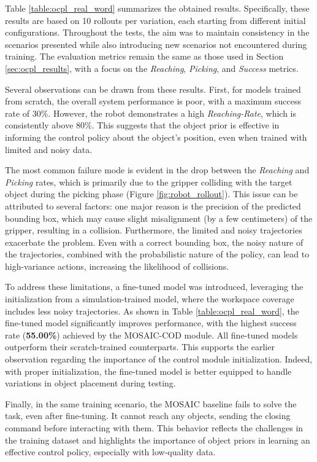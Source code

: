 Table \ref{table:ocpl_real_word} summarizes the obtained results. Specifically, these results are based on 10 rollouts per variation, each starting from different initial configurations. Throughout the tests, the aim was to maintain consistency in the scenarios presented while also introducing new scenarios not encountered during training. The evaluation metrics remain the same as those used in Section \ref{sec:ocpl_results}, with a focus on the \textit{Reaching}, \textit{Picking}, and \textit{Success} metrics.


Several observations can be drawn from these results. First, for models trained from scratch, the overall system performance is poor, with a maximum success rate of 30\%. However, the robot demonstrates a high \textit{Reaching-Rate}, which is consistently above 80\%. This suggests that the object prior is effective in informing the control policy about the object's position, even when trained with limited and noisy data. 

The most common failure mode is evident in the drop between the \textit{Reaching} and \textit{Picking} rates, which is primarily due to the gripper colliding with the target object during the picking phase (Figure \ref{fig:robot_rollout}). This issue can be attributed to several factors: one major reason is the precision of the predicted bounding box, which may cause slight misalignment (by a few centimeters) of the gripper, resulting in a collision. Furthermore, the limited and noisy trajectories exacerbate the problem. Even with a correct bounding box, the noisy nature of the trajectories, combined with the probabilistic nature of the policy, can lead to high-variance actions, increasing the likelihood of collisions.


To address these limitations, a fine-tuned model was introduced, leveraging the initialization from a simulation-trained model, where the workspace coverage includes less noisy trajectories. As shown in Table \ref{table:ocpl_real_word}, the fine-tuned model significantly improves performance, with the highest success rate (\textbf{55.00\%}) achieved by the MOSAIC-COD module. All fine-tuned models outperform their scratch-trained counterparts. This supports the earlier observation regarding the importance of the control module initialization. Indeed, with proper initialization, the fine-tuned model is better equipped to handle variations in object placement during testing.

Finally, in the same training scenario, the MOSAIC baseline fails to solve the task, even after fine-tuning. It cannot reach any objects, sending the closing command before interacting with them. This behavior reflects the challenges in the training dataset and highlights the importance of object priors in learning an effective control policy, especially with low-quality data.

